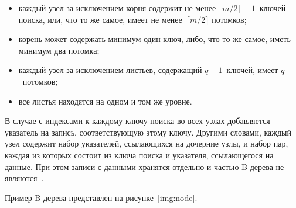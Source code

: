\begin{itemize}
    \item каждый узел за исключением корня содержит не менее $\lceil m / 2
        \rceil - 1$~ключей поиска, или, что то же самое, имеет не менее~$\lceil
        m / 2 \rceil$ потомков;

    \item корень может содержать минимум один ключ, либо, что то же самое, иметь
        минимум два потомка;

    \item каждый узел за исключением листьев, содержащий $q-1$~ключей, имеет
        $q$~потомков;

    \item все листья находятся на одном и том же уровне.
\end{itemize}

В случае с индексами к каждому ключу поиска во всех узлах добавляется указатель
на запись, соответствующую этому ключу. Другими словами, каждый узел содержит
набор указателей, ссылающихся на дочерние узлы, и набор пар, каждая из которых
состоит из ключа поиска и указателя, ссылающегося на данные. При этом записи с
данными хранятся отдельно и частью B-дерева не являются~\cite{arki}.

Пример B-дерева представлен на рисунке~\ref{img:node}.


%
%

%
%
%
%
%

